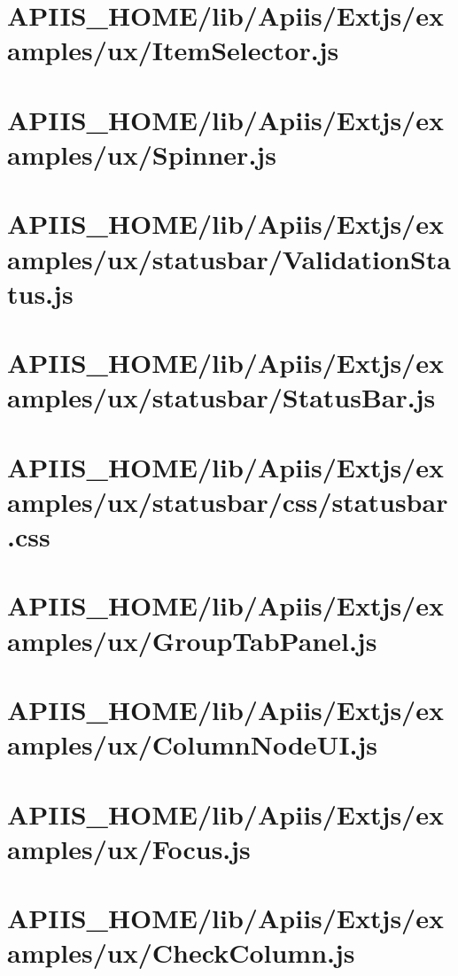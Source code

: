 \section{APIIS\_HOME/lib/Apiis/Extjs/examples/ux/ItemSelector.js} 
\section{APIIS\_HOME/lib/Apiis/Extjs/examples/ux/Spinner.js} 
\section{APIIS\_HOME/lib/Apiis/Extjs/examples/ux/statusbar/ValidationStatus.js} 
\section{APIIS\_HOME/lib/Apiis/Extjs/examples/ux/statusbar/StatusBar.js} 
\section{APIIS\_HOME/lib/Apiis/Extjs/examples/ux/statusbar/css/statusbar.css} 
\section{APIIS\_HOME/lib/Apiis/Extjs/examples/ux/GroupTabPanel.js} 
\section{APIIS\_HOME/lib/Apiis/Extjs/examples/ux/ColumnNodeUI.js} 
\section{APIIS\_HOME/lib/Apiis/Extjs/examples/ux/Focus.js} 
\section{APIIS\_HOME/lib/Apiis/Extjs/examples/ux/CheckColumn.js} 
